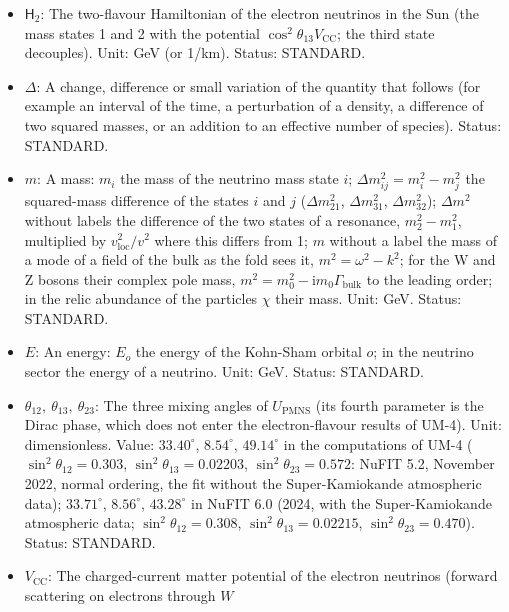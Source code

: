 \documentclass[
  10pt,
]{article}
\providecommand{\tightlist}{%
  \setlength{\itemsep}{0pt}\setlength{\parskip}{0pt}}
\begin{document}
\begin{itemize}
\tightlist
\item
  \(\mathsf{H}_{2}\): The two-flavour Hamiltonian of the electron
  neutrinos in the Sun (the mass states 1 and 2 with the potential
  \(\cos^2\theta_{13}V_{\mathrm{CC}}\); the third state decouples).
  Unit: GeV (or 1/km). Status: STANDARD.
\item
  \(\Delta\): A change, difference or small variation of the quantity
  that follows (for example an interval of the time, a perturbation of a
  density, a difference of two squared masses, or an addition to an
  effective number of species). Status: STANDARD.
\item
  \(m\): A mass: \(m_i\) the mass of the neutrino mass state \(i\);
  \(\Delta m_{ij}^2 = m_i^2 - m_j^2\) the squared-mass difference of the
  states \(i\) and \(j\) (\(\Delta m_{21}^2\), \(\Delta m_{31}^2\),
  \(\Delta m_{32}^2\)); \(\Delta m^2\) without labels the difference of
  the two states of a resonance, \(m_2^2 - m_1^2\), multiplied by
  \(v_{\mathrm{loc}}^2/v^2\) where this differs from 1; \(m\) without a
  label the mass of a mode of a field of the bulk as the fold sees it,
  \(m^2 = \omega^2 - k^2\); for the W and Z bosons their complex pole
  mass, \(m^2 = m_0^2 - \mathrm{i}m_0\Gamma_{\mathrm{bulk}}\) to the
  leading order; in the relic abundance of the particles \(\chi\) their
  mass. Unit: GeV. Status: STANDARD.
\item
  \(E\): An energy: \(E_o\) the energy of the Kohn-Sham orbital \(o\);
  in the neutrino sector the energy of a neutrino. Unit: GeV. Status:
  STANDARD.
\item
  \(\theta_{12},\ \theta_{13},\ \theta_{23}\): The three mixing angles
  of \(U_{\mathrm{PMNS}}\) (its fourth parameter is the Dirac phase,
  which does not enter the electron-flavour results of UM-4). Unit:
  dimensionless. Value: \(33.40^\circ\), \(8.54^\circ\), \(49.14^\circ\)
  in the computations of UM-4 (\(\sin^2\theta_{12} = 0.303\),
  \(\sin^2\theta_{13} = 0.02203\), \(\sin^2\theta_{23} = 0.572\): NuFIT
  5.2, November 2022, normal ordering, the fit without the
  Super-Kamiokande atmospheric data); \(33.71^\circ\), \(8.56^\circ\),
  \(43.28^\circ\) in NuFIT 6.0 (2024, with the Super-Kamiokande
  atmospheric data; \(\sin^2\theta_{12} = 0.308\),
  \(\sin^2\theta_{13} = 0.02215\), \(\sin^2\theta_{23} = 0.470\)).
  Status: STANDARD.
\item
  \(V_{\mathrm{CC}}\): The charged-current matter potential of the
  electron neutrinos (forward scattering on electrons through \(W\)

\end{itemize}
\end{document}
